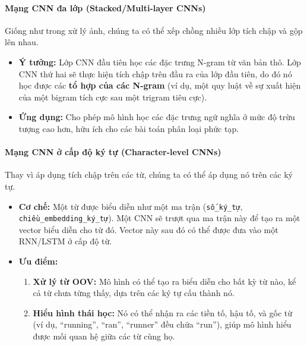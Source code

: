 \paragraph{Mạng CNN đa lớp (Stacked/Multi-layer CNNs)}
Giống như trong xử lý ảnh, chúng ta có thể xếp chồng nhiều lớp tích chập và gộp lên nhau.
\begin{itemize}
    \item \textbf{Ý tưởng:} Lớp CNN đầu tiên học các đặc trưng N-gram từ văn bản thô. Lớp CNN thứ hai sẽ thực hiện tích chập trên đầu ra của lớp đầu tiên, do đó nó học được các \textbf{tổ hợp của các N-gram} (ví dụ, một quy luật về sự xuất hiện của một bigram tích cực sau một trigram tiêu cực).
    \item \textbf{Ứng dụng:} Cho phép mô hình học các đặc trưng ngữ nghĩa ở mức độ trừu tượng cao hơn, hữu ích cho các bài toán phân loại phức tạp.
\end{itemize}

\paragraph{Mạng CNN ở cấp độ ký tự (Character-level CNNs)}
Thay vì áp dụng tích chập trên các từ, chúng ta có thể áp dụng nó trên các ký tự.
\begin{itemize}
    \item \textbf{Cơ chế:} Một từ được biểu diễn như một ma trận (\texttt{số\_ký\_tự}, \texttt{chiều\_\allowbreak embedding\_\allowbreak ký\_\allowbreak tự}). Một CNN sẽ trượt qua ma trận này để tạo ra một vector biểu diễn cho từ đó. Vector này sau đó có thể được đưa vào một RNN/LSTM ở cấp độ từ.
    \item \textbf{Ưu điểm:}
        \begin{enumerate}
            \item \textbf{Xử lý từ OOV:} Mô hình có thể tạo ra biểu diễn cho bất kỳ từ nào, kể cả từ chưa từng thấy, dựa trên các ký tự cấu thành nó.
            \item \textbf{Hiểu hình thái học:} Nó có thể nhận ra các tiền tố, hậu tố, và gốc từ (ví dụ, “running”, “ran”, “runner” đều chứa “run”), giúp mô hình hiểu được mối quan hệ giữa các từ cùng họ.
        \end{enumerate}
\end{itemize}

